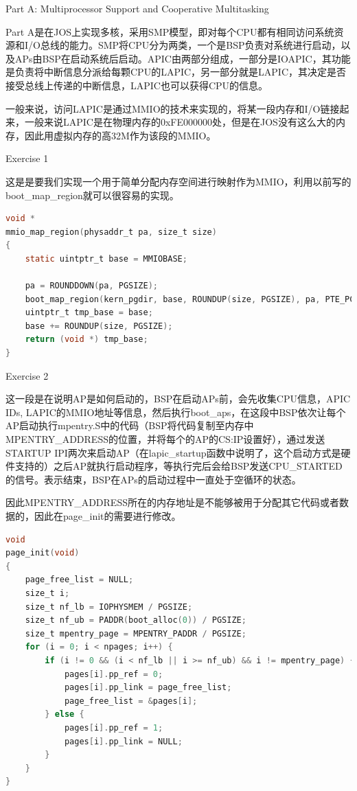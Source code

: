 \documentclass[GBK,winfonts,a4paper,10pt]{ctexart}
\begin{document}
\begin{section}{Part A: Multiprocessor Support and Cooperative Multitasking}
\par
Part A是在JOS上实现多核，采用SMP模型，即对每个CPU都有相同访问系统资源和I/O总线的能力。SMP将CPU分为两类，一个是BSP负责对系统进行启动，以及APs由BSP在启动系统后启动。APIC由两部分组成，一部分是IOAPIC，其功能是负责将中断信息分派给每颗CPU的LAPIC，另一部分就是LAPIC，其决定是否接受总线上传递的中断信息，LAPIC也可以获得CPU的信息。
\par
一般来说，访问LAPIC是通过MMIO的技术来实现的，将某一段内存和I/O链接起来，一般来说LAPIC是在物理内存的0xFE000000处，但是在JOS没有这么大的内存，因此用虚拟内存的高32M作为该段的MMIO。

\begin{subsection}{Exercise 1}
\par
这是是要我们实现一个用于简单分配内存空间进行映射作为MMIO，利用以前写的boot\_map\_region就可以很容易的实现。
\begin{lstlisting}[language=C]
void *
mmio_map_region(physaddr_t pa, size_t size)
{
	static uintptr_t base = MMIOBASE;

	pa = ROUNDDOWN(pa, PGSIZE);
	boot_map_region(kern_pgdir, base, ROUNDUP(size, PGSIZE), pa, PTE_PCD | PTE_PWT | PTE_W);
	uintptr_t tmp_base = base;
	base += ROUNDUP(size, PGSIZE);
	return (void *) tmp_base;
}
\end{lstlisting}
\end{subsection}

\begin{subsection}{Exercise 2}
\par
这一段是在说明AP是如何启动的，BSP在启动APs前，会先收集CPU信息，APIC IDs, LAPIC的MMIO地址等信息，然后执行boot\_aps，在这段中BSP依次让每个AP启动执行mpentry.S中的代码（BSP将代码复制至内存中MPENTRY\_ADDRESS的位置，并将每个的AP的CS:IP设置好），通过发送STARTUP IPI两次来启动AP（在lapic\_startup函数中说明了，这个启动方式是硬件支持的）之后AP就执行启动程序，等执行完后会给BSP发送CPU\_STARTED的信号。表示结束，BSP在APs的启动过程中一直处于空循环的状态。
\par
因此MPENTRY\_ADDRESS所在的内存地址是不能够被用于分配其它代码或者数据的，因此在page\_init的需要进行修改。
\begin{lstlisting}[language=C]
void
page_init(void)
{
    page_free_list = NULL;
    size_t i;
	size_t nf_lb = IOPHYSMEM / PGSIZE;
    size_t nf_ub = PADDR(boot_alloc(0)) / PGSIZE;
    size_t mpentry_page = MPENTRY_PADDR / PGSIZE;
    for (i = 0; i < npages; i++) {
        if (i != 0 && (i < nf_lb || i >= nf_ub) && i != mpentry_page) {
		    pages[i].pp_ref = 0;
            pages[i].pp_link = page_free_list;
		    page_free_list = &pages[i];
        } else {
            pages[i].pp_ref = 1;
            pages[i].pp_link = NULL;
        }
	}
}
\end{lstlisting}
\end{subsection}


\end{section}
\end{document}
